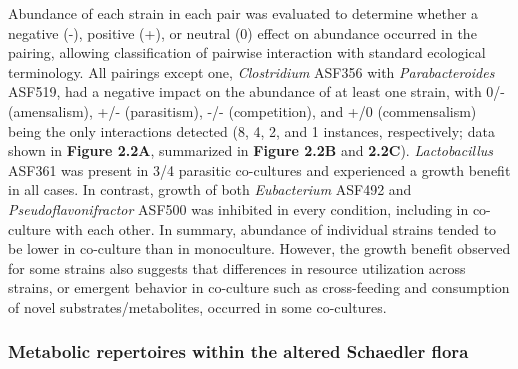 \documentclass[11pt,twocolumn,notitlepage,openany,twoside]{book}
\begin{document}
\begin{refsection}
Abundance of each strain in each pair was evaluated to determine whether a negative (-), positive (+), or neutral (0) effect on abundance occurred in the pairing, allowing classification of pairwise interaction with standard ecological terminology. All pairings except one, \textit{Clostridium} ASF356 with \textit{Parabacteroides} ASF519, had a negative impact on the abundance of at least one strain, with 0/- (amensalism), +/- (parasitism), -/- (competition), and +/0 (commensalism) being the only interactions detected (8, 4, 2, and 1 instances, respectively; data shown in \textbf{Figure 2.2A}, summarized in \textbf{Figure 2.2B} and \textbf{2.2C}). \textit{Lactobacillus} ASF361 was present in 3/4 parasitic co-cultures and experienced a growth benefit in all cases. In contrast, growth of both \textit{Eubacterium} ASF492 and \textit{Pseudoflavonifractor} ASF500 was inhibited in every condition, including in co-culture with each other. In summary, abundance of individual strains tended to be lower in co-culture than in monoculture. However, the growth benefit observed for some strains also suggests that differences in resource utilization across strains, or emergent behavior in co-culture such as cross-feeding and consumption of novel substrates/metabolites, occurred in some co-cultures.

\subsubsection{Metabolic repertoires within the altered Schaedler flora}


\end{refsection}
\end{document}
